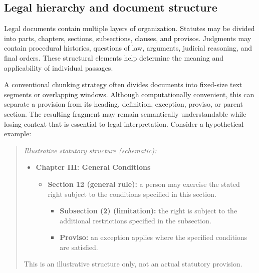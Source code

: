 \subsection{Legal hierarchy and document structure}

Legal documents contain multiple layers of organization. Statutes may be divided into parts, chapters,
sections, subsections, clauses, and provisos. Judgments may contain procedural histories, questions of
law, arguments, judicial reasoning, and final orders. These structural elements help determine the
meaning and applicability of individual passages.

A conventional chunking strategy often divides documents into fixed-size text segments or overlapping
windows. Although computationally convenient, this can separate a provision from its heading, definition,
exception, proviso, or parent section. The resulting fragment may remain semantically understandable
while losing context that is essential to legal interpretation. Consider a hypothetical example:

\begin{quote}
\textit{Illustrative statutory structure (schematic):}
\begin{itemize}[leftmargin=1.3em, itemsep=1pt, topsep=2pt]
\item \textbf{Chapter III: General Conditions}
  \begin{itemize}[leftmargin=1.2em, itemsep=1pt, topsep=1pt]
  \item \textbf{Section 12 (general rule):} a person may exercise the stated right subject to the
  conditions specified in this section.
    \begin{itemize}[leftmargin=1.2em, itemsep=1pt, topsep=1pt]
    \item \textbf{Subsection (2) (limitation):} the right is subject to the additional restrictions
    specified in the subsection.
    \item \textbf{Proviso:} an exception applies where the specified conditions are satisfied.
    \end{itemize}
  \end{itemize}
\end{itemize}
This is an illustrative structure only, not an actual statutory provision.
\end{quote}

